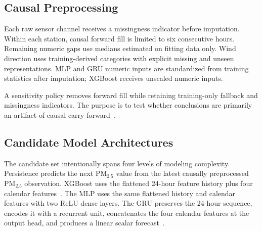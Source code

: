 \documentclass[journal]{IEEEtran}
\begin{document}
\subsection{Causal Preprocessing}
Each raw sensor channel receives a missingness indicator before imputation. Within each station, causal forward fill is limited to six consecutive hours. Remaining numeric gaps use medians estimated on fitting data only. Wind direction uses training-derived categories with explicit missing and unseen representations. MLP and GRU numeric inputs are standardized from training statistics after imputation; XGBoost receives unscaled numeric inputs.

A sensitivity policy removes forward fill while retaining training-only fallback and missingness indicators. The purpose is to test whether conclusions are primarily an artifact of causal carry-forward~\cite{chowdhury2026imputation}.

\subsection{Candidate Model Architectures}
The candidate set intentionally spans four levels of modeling complexity. Persistence predicts the next PM$_{2.5}$ value from the latest causally preprocessed PM$_{2.5}$ observation. XGBoost uses the flattened 24-hour feature history plus four calendar features~\cite{chen2016xgboost}. The MLP uses the same flattened history and calendar features with two ReLU dense layers. The GRU preserves the 24-hour sequence, encodes it with a recurrent unit, concatenates the four calendar features at the output head, and produces a linear scalar forecast~\cite{cho2014gru}.
\end{document}
